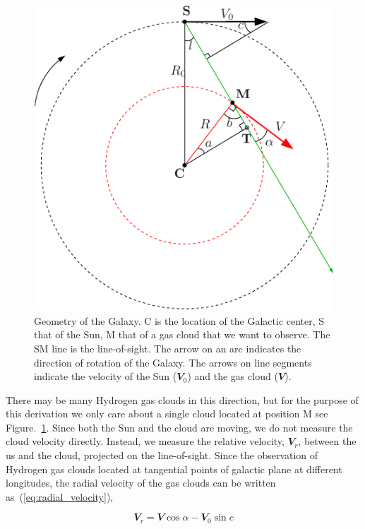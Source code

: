 \documentclass[fleqn,usenatbib]{mnras}
\begin{document}
\begin{figure}
 \includegraphics[width=\columnwidth]{galgeom}
 \caption{Geometry of the Galaxy. C is the location of the Galactic center, S that of the Sun, M
that of a gas cloud that we want to observe. The SM line is the line-of-sight. The arrow
on an arc indicates the direction of rotation of the Galaxy. The arrows on line segments
indicate the velocity of the Sun ($\mathbfit{V}_{0}$) and the gas cloud ($\mathbfit{V}$).}
 \label{fig:galgeo_figure}
\end{figure}

There may be many Hydrogen gas clouds in this direction, but for the purpose of this derivation we only care about a single cloud located at position M see Figure.~\ref{fig:galgeo_figure}. Since both the Sun and the cloud are moving, we do not measure the cloud velocity directly. Instead, we measure the relative velocity, $\mathbfit{V}_{r}$, between the us and the cloud, projected on the line-of-sight. Since the observation of Hydrogen gas clouds located at tangential points of galactic plane at different longitudes, the radial velocity of the gas clouds can be written as~(\ref{eq:radial_velocity}),

\begin{equation}
  \mathbfit{V}_{r}=\mathbfit{V}\cos\alpha-\mathbfit{V}_{0}\sin c
  \label{eq:radial_velocity}
\end{equation}
\end{document}
